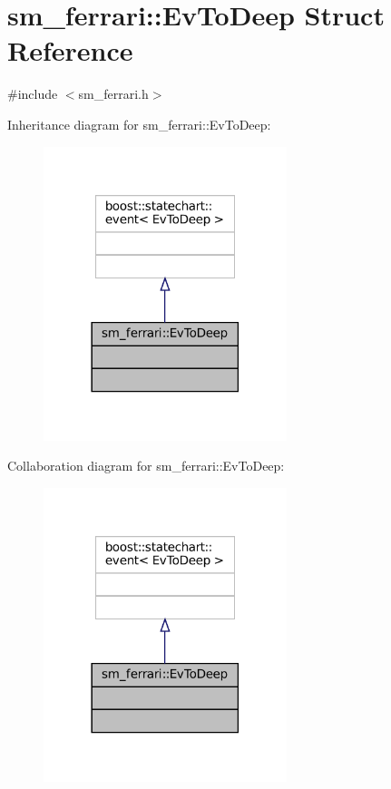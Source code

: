 \hypertarget{structsm__ferrari_1_1EvToDeep}{}\section{sm\+\_\+ferrari\+:\+:Ev\+To\+Deep Struct Reference}
\label{structsm__ferrari_1_1EvToDeep}


{\ttfamily \#include $<$sm\+\_\+ferrari.\+h$>$}



Inheritance diagram for sm\+\_\+ferrari\+:\+:Ev\+To\+Deep\+:
\nopagebreak
\begin{figure}[H]
\begin{center}
\leavevmode
\includegraphics[width=201pt]{structsm__ferrari_1_1EvToDeep__inherit__graph}
\end{center}
\end{figure}


Collaboration diagram for sm\+\_\+ferrari\+:\+:Ev\+To\+Deep\+:
\nopagebreak
\begin{figure}[H]
\begin{center}
\leavevmode
\includegraphics[width=201pt]{structsm__ferrari_1_1EvToDeep__coll__graph}
\end{center}
\end{figure}


